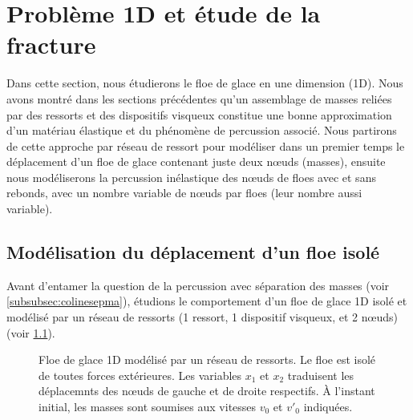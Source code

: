 
\chapter{Problème 1D et étude de la fracture} %

\label{Chapter3} %





Dans cette section, nous étudierons le floe de glace en une dimension (1D). Nous avons montré dans les sections précédentes qu'un assemblage de masses reliées par des ressorts et des dispositifs visqueux constitue une bonne approximation d'un matériau élastique et du phénomène de percussion associé. Nous partirons de cette approche par réseau de ressort pour modéliser dans un premier temps le déplacement d'un floe de glace contenant juste deux n\oe{}uds (masses), ensuite nous modéliserons la percussion inélastique des n\oe{}uds de floes avec et sans rebonds, avec un nombre variable de n\oe{}uds par floes  (leur nombre aussi variable). 





\section{Modélisation du déplacement d'un floe isolé}
\label{subsubsec:moddep1D}


Avant d'entamer la question de la percussion avec séparation des masses (voir \cref{subsubsec:colinesepma}), étudions le comportement d'un floe de glace 1D isolé et modélisé par un réseau de ressorts (1 ressort, 1 dispositif visqueux, et 2 n\oe{}uds) (voir \cref{fig:deplacement1d}).
\begin{figure}[!h]
    \centering
    \caption{Floe de glace 1D modélisé par un réseau de ressorts. Le floe est isolé de toutes forces extérieures. Les variables $x_1$ et $x_2$ traduisent les déplacemnts des n\oe{}uds de gauche et de droite respectifs. À l'instant initial, les masses sont soumises aux vitesses $v_0$ et $v'_0$ indiquées.}
    \label{fig:deplacement1d}
\end{figure}


